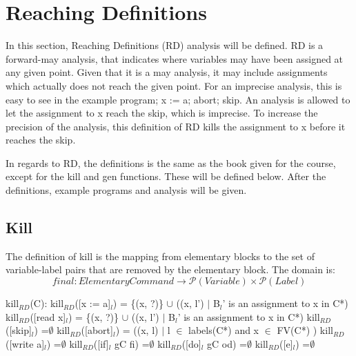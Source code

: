 \section{Reaching Definitions}

In this section, Reaching Definitions (RD) analysis will be defined.
RD is a forward-may analysis, that indicates where variables may have
been assigned at any given point. Given that it is a may analysis,
it may include assignments which actually does not reach the given point.
For an imprecise analysis, this is easy to see in the example program;
x := a; abort; skip. An analysis is allowed to let the assignment to x
reach the skip, which is imprecise. To increase the precision of the analysis,
this definition of RD kills the assignment to x before it reaches the skip.

In regards to RD, the definitions is the same as the book given for the course,
except for the kill and gen functions. These will be defined below.
After the definitions, example programs and analysis will be given.

\subsection{Kill}

The definition of kill is the mapping from elementary blocks to the set of variable-label pairs
that are removed by the elementary block. The domain is:
\[final \colon Elementary Command \to \mathcal{P}(Variable)\times\mathcal{P}(Label)\]

kill$_{RD}$(C):\newline
kill$_{RD}$([x := a]$_l$)           = \{(x, ?)\} $\cup$ ((x, l') $\vert$ B$_l$' is an assignment to x in C*)\newline
kill$_{RD}$([read x]$_l$)           = \{(x, ?)\} $\cup$ ((x, l') $\vert$ B$_l$' is an assignment to x in C*)\newline
kill$_{RD}$([skip]$_l$)             =$\emptyset$\newline
kill$_{RD}$([abort]$_l$) 			= ((x, l) $\vert$ l $\in$ labels(C*) and x $\in$ FV(C*) )\newline
kill$_{RD}$([write a]$_l$)          =$\emptyset$\newline
kill$_{RD}$([if]$_l$ gC fi)         =$\emptyset$\newline
kill$_{RD}$([do]$_l$ gC od)         =$\emptyset$\newline
kill$_{RD}$([e]$_l$)                =$\emptyset$\newline

